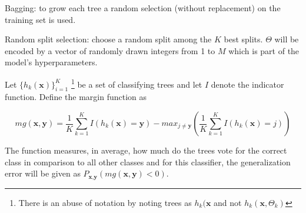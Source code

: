Bagging: to grow each tree a random selection (without replacement) on the training set is used. 

Random split selection: choose a random split among the $K$ best splits. $\Theta$ will be encoded by a vector of randomly drawn integers from 1 to $M$ which is part of the model's hyperparameters.

Let $\{h_k(\textbf{x})\}_{i=1}^K$  \footnote{There is an abuse of notation by noting trees as $h_k(\textbf{x}$ and not $h_k(\textbf{x}, \Theta_k)$ } be a set of classifying trees and let $I$ denote the indicator function.  Define the margin function as

\begin{equation} \label{eq:rf-marginFun}

 mg(\textbf{x},\textbf{y}) = \frac{1}{K}  \sum_{k=1}^K I(h_k(\textbf{x}) = \textbf{y})  
 - max_{j\neq \textbf{y}}(\frac{1}{K} \sum_{k=1}^K I(h_k(\textbf{x}) = j) ) 

\end{equation}

The function measures, in average, how much do the trees vote for the correct class in comparison to all other classes and for this classifier, the generalization error will be given as 
$ P_{\textbf{x}, \textbf{y} }(mg(\textbf{x}, \textbf{y}) < 0) $.



